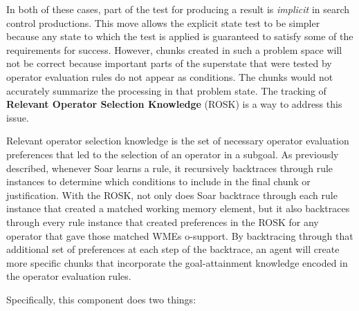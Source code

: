 In both of these cases, part of the test for producing a result is \emph{implicit} in search control productions. This move allows the explicit state test to be simpler because any state to which the test is applied is guaranteed to satisfy some of the requirements for success. However, chunks created in such a problem space will not be correct because important parts of the superstate that were tested by operator evaluation rules do not appear as conditions. The chunks would not accurately summarize the processing in that problem state.  The tracking of \textbf{Relevant Operator Selection Knowledge} (ROSK) is a way to address this issue.

Relevant operator selection knowledge is the set of necessary operator evaluation preferences that led to the selection of an operator in a subgoal.  As previously described, whenever Soar learns a rule, it recursively backtraces through rule instances to determine which conditions to include in the final chunk or justification. With the ROSK, not only does Soar backtrace through each rule instance that created a matched working memory element, but it also backtraces through every rule instance that created preferences in the ROSK for any operator that gave those matched WMEs o-support. By backtracing through that additional set of preferences at each step of the backtrace, an agent will create more specific chunks that incorporate the goal-attainment knowledge encoded in the operator evaluation rules.

Specifically, this component does two things:

